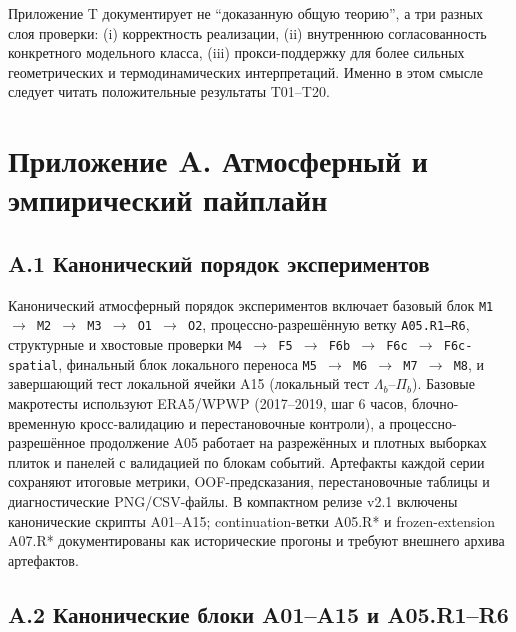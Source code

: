 \documentclass[11pt,a4paper]{article}
\theoremstyle{definition}
\theoremstyle{plain}
\theoremstyle{remark}
\begin{document}
Приложение T документирует не ``доказанную общую теорию'', а три разных слоя проверки:
(i) корректность реализации,
(ii) внутреннюю согласованность конкретного модельного класса,
(iii) прокси-поддержку для более сильных геометрических и термодинамических интерпретаций.
Именно в этом смысле следует читать положительные результаты T01--T20.

\newpage
{}
\section*{Приложение A. Атмосферный и эмпирический пайплайн}
\label{sec:appendix:atmo}

\subsection*{A.1 Канонический порядок экспериментов}

Канонический атмосферный порядок экспериментов включает базовый блок
\texttt{M1 $\rightarrow$ M2 $\rightarrow$ M3 $\rightarrow$ O1 $\rightarrow$ O2},
процессно-разрешённую ветку \texttt{A05.R1--R6},
структурные и хвостовые проверки \texttt{M4 $\rightarrow$ F5 $\rightarrow$ F6b $\rightarrow$ F6c $\rightarrow$ F6c-spatial},
финальный блок локального переноса \texttt{M5 $\rightarrow$ M6 $\rightarrow$ M7 $\rightarrow$ M8},
	и завершающий тест локальной ячейки A15 (локальный тест $\Lambda_b$--$\Pi_b$).
Базовые макротесты используют ERA5/WPWP (2017--2019, шаг 6 часов, блочно-временную кросс-валидацию и перестановочные контроли),
а процессно-разрешённое продолжение A05 работает на разрежённых и плотных выборках плиток и панелей с валидацией по блокам событий.
Артефакты каждой серии сохраняют итоговые метрики, OOF-предсказания, перестановочные таблицы и диагностические PNG/CSV-файлы.
В компактном релизе v2.1 включены канонические скрипты A01--A15; continuation-ветки A05.R* и frozen-extension A07.R* документированы как исторические прогоны и требуют внешнего архива артефактов.

\subsection*{A.2 Канонические блоки A01--A15 и A05.R1--R6}
\end{document}
